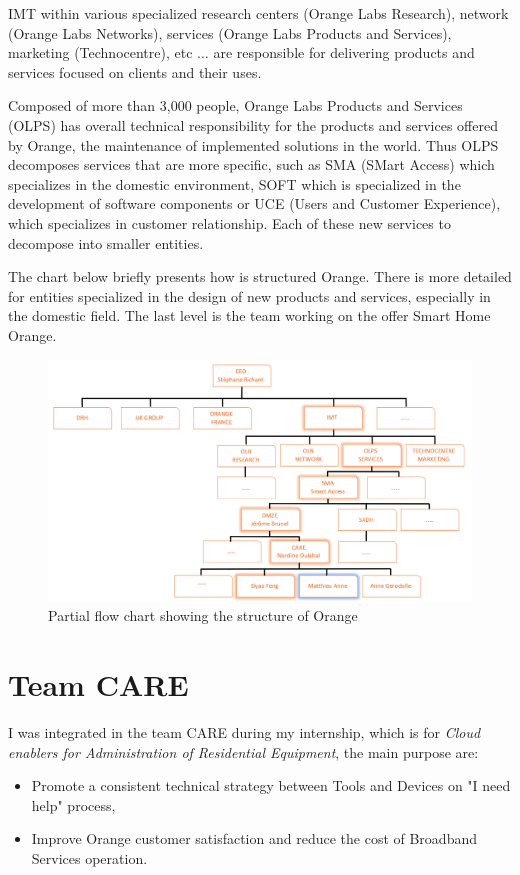 IMT within various specialized research centers (Orange Labs Research), network (Orange Labs Networks), services (Orange Labs Products and Services), marketing (Technocentre), etc ... are responsible for delivering products and services focused on clients and their uses.

Composed of more than 3,000 people, Orange Labs Products and Services (OLPS) has overall technical responsibility for the products and services offered by Orange, the maintenance of implemented solutions in the world. Thus OLPS decomposes services that are more specific, such as SMA (SMart Access) which specializes in the domestic environment, SOFT which is specialized in the development of software components or UCE (Users and Customer Experience), which specializes in customer relationship. Each of these new services to decompose into smaller entities.

The chart below briefly presents how is structured Orange. There is more detailed for entities specialized in the design of new products and services, especially in the domestic field. The last level is the team working on the offer Smart Home Orange.

\begin{figure}[htbp]
	\centering
		\includegraphics[width=15cm]{Figures/orgadiagramme.png}
	\caption[Partial flow chart showing the structure of Orange]{Partial flow chart showing the structure of Orange}
	\label{fig:structure}
\end{figure}
\section{Team CARE}

I was integrated in the team CARE during my internship, which is for \textit{Cloud enablers for Administration of Residential Equipment}, the main purpose are:
\begin{itemize}
	\item Promote a consistent technical strategy between Tools and Devices on "I need help" process,
	\item Improve Orange customer satisfaction and reduce the cost of Broadband Services operation.
\end{itemize}

